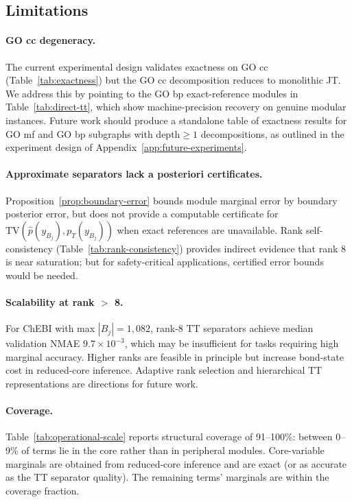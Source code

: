 \documentclass[12pt]{article}
\begin{document}
\subsection{Limitations}

\paragraph{GO cc degeneracy.}
The current experimental design validates exactness on GO cc
(Table~\ref{tab:exactness}) but the GO cc decomposition reduces to
monolithic JT. We address this by pointing to the GO bp exact-reference
modules in Table~\ref{tab:direct-tt}, which show machine-precision
recovery on genuine modular instances. Future work should produce a
standalone table of exactness results for GO mf and GO bp subgraphs
with depth$\geq 1$ decompositions, as outlined in the experiment
design of Appendix~\ref{app:future-experiments}.

\paragraph{Approximate separators lack a posteriori certificates.}
Proposition~\ref{prop:boundary-error} bounds module marginal error by
boundary posterior error, but does not provide a computable
certificate for $\mathrm{TV}(\widehat{p}(y_{B_j}), p_T(y_{B_j}))$
when exact references are unavailable. Rank self-consistency
(Table~\ref{tab:rank-consistency}) provides indirect evidence that
rank 8 is near saturation; but for safety-critical applications,
certified error bounds would be needed.

\paragraph{Scalability at rank $>$ 8.}
For ChEBI with max $|B_j|=1{,}082$, rank-8 TT separators achieve
median validation NMAE $9.7\times10^{-3}$, which may be insufficient
for tasks requiring high marginal accuracy. Higher ranks are feasible
in principle but increase bond-state cost in reduced-core inference.
Adaptive rank selection and hierarchical TT representations are
directions for future work.

\paragraph{Coverage.}
Table~\ref{tab:operational-scale} reports structural coverage of
91--100\%: between 0--9\% of terms lie in the core rather than in
peripheral modules. Core-variable marginals are obtained from
reduced-core inference and are exact (or as accurate as the TT
separator quality). The remaining terms' marginals are within the
coverage fraction.
\end{document}
